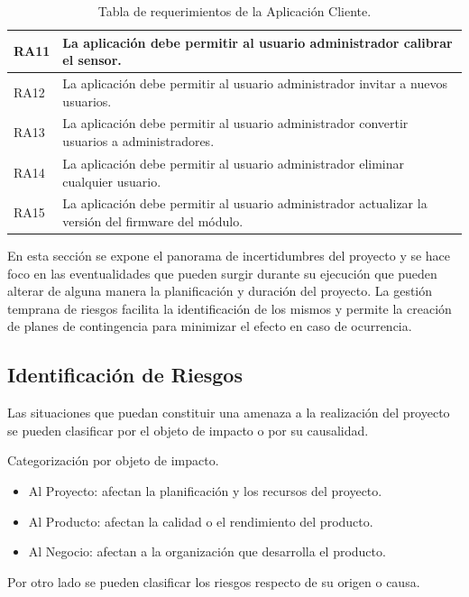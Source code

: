 \begin{table}[ht]
\begin{tabular}{|l|m{12cm}|}
		RA11                              & La aplicación debe permitir al usuario administrador calibrar el sensor.                                  \\ \hline
		RA12                              & La aplicación debe permitir al usuario administrador invitar a nuevos usuarios.                           \\ \hline
		RA13                              & La aplicación debe permitir al usuario administrador convertir usuarios a administradores.                \\ \hline
		RA14                              & La aplicación debe permitir al usuario administrador eliminar cualquier usuario.                          \\ \hline
		RA15                              & La aplicación debe permitir al usuario administrador actualizar la versión del firmware del módulo.       \\ \hline
	\end{tabular}
	\caption[Requerimientos de la Aplicación]{Tabla de requerimientos de la Aplicación Cliente.}
	\label{table:req_aplicacion}
\end{table}

En esta sección se expone el panorama de incertidumbres del proyecto y se hace foco en las eventualidades que pueden surgir durante su ejecución que pueden alterar de alguna manera la planificación y duración del proyecto.
La gestión temprana de riesgos facilita la identificación de los mismos y permite la creación de planes de contingencia para minimizar el efecto en caso de ocurrencia.

\subsection{Identificación de Riesgos}
Las situaciones que puedan constituir una amenaza a la realización del proyecto se pueden clasificar por el objeto de impacto o por su causalidad.

Categorización por objeto de impacto.
\begin{itemize}
	\item Al Proyecto: afectan la planificación y los recursos del proyecto.
	\item Al Producto: afectan la calidad o el rendimiento del producto.
	\item Al Negocio: afectan a la organización que desarrolla el producto.
\end{itemize}


Por otro lado se pueden clasificar los riesgos respecto de su origen o causa.

